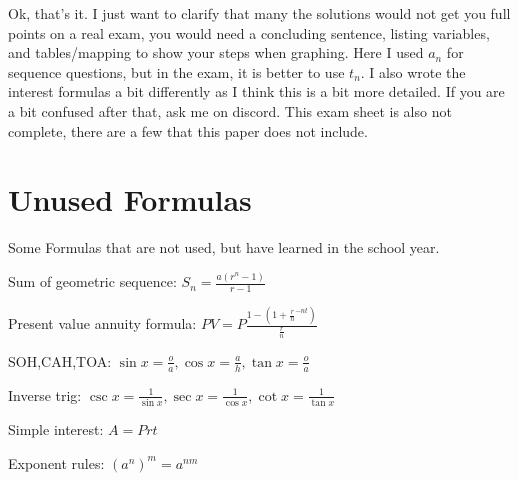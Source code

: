 \documentclass[paper=a4, fontsize=11pt]{scrartcl}
\begin{document}
Ok, that's it. I just want to clarify that many the solutions would not get you full points on a real exam, you would need a concluding sentence, listing variables, and tables/mapping to show your steps when graphing. Here I used $a_n$ for sequence questions, but in the exam, it is better to use $t_n$.
I also wrote the interest formulas a bit differently as I think this is a bit more detailed. If you are a bit confused after that, ask me on discord.
This exam sheet is also not complete, there are a few that this paper does not include.

\section{Unused Formulas}

Some Formulas that are not used, but have learned in the school year.

Sum of geometric sequence: $S_n=\frac{a(r^n-1)}{r-1}$

Present value annuity formula: $PV=P\frac{1-(1+\frac{r}{n}^{-nt})}{\frac{r}{n}}$

SOH,CAH,TOA: $\sin x= \frac{o}{a},\cos x=\frac{a}{h},\tan x=\frac{o}{a}$

Inverse trig: $\csc x=\frac{1}{\sin x},\sec x=\frac{1}{\cos x},\cot x=\frac{1}{\tan x}$

Simple interest: $A=Prt$

Exponent rules: $(a^n)^m=a^{nm}$
\printindex
\end{document}
